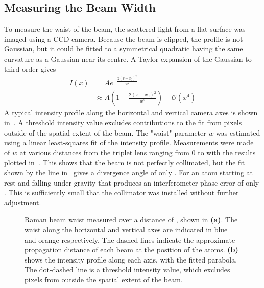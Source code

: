 \subsection{Measuring the Beam Width}
To measure the waist of the beam, the scattered light from a flat surface was imaged
using a CCD camera. Because the beam is clipped, the profile is not
Gaussian, but it could be fitted to a symmetrical quadratic having the
same curvature as a Gaussian near its centre. 
A Taylor expansion of the Gaussian to third order gives
\begin{align}
	I(x) & = A e^{-\frac{2(x-x_0)^2}{ w^2}} \nonumber                                                                              \\
       & \approx A\left(1-\frac{2(x- x_0)^2}{w^2}\right) +
       \mathcal{O}(x^4)
\end{align}
A typical intensity profile along the horizontal and vertical camera axes is
shown in~. A threshold intensity value excludes
contributions to the fit from pixels outside of the spatial extent of
the beam. The "waist" parameter $w$
was estimated using a linear least-squares fit of the intensity
profile. 
Measurements were made of $w$ at various distances from the triplet
lens ranging from 0 to  with the results plotted
in~. This shows that the beam is not
perfectly collimated, but the fit shown by the line
in~ gives a divergence angle of only
. For an atom starting at rest and
falling under gravity that produces an interferometer phase error of
only . This is sufficiently small
that the collimator was installed without further adjustment. 
\begin{figure} 
  \centering
	\def\svgwidth{\columnwidth}
	\caption[Measured Raman beam waist]{Raman beam waist measured over a distance
		of , shown in \textbf{(a)}. The waist along the
		horizontal and vertical axes are indicated in blue and orange respectively.
		The dashed lines indicate the approximate propagation distance of each beam
		at the position of the atoms. \textbf{(b)} shows the intensity profile along
		each axis, with the fitted parabola. The dot-dashed line is a threshold
		intensity value, which excludes pixels from outside the spatial extent of
		the beam.} 
  \label{fig:beam_waist_plots} 
\end{figure}
